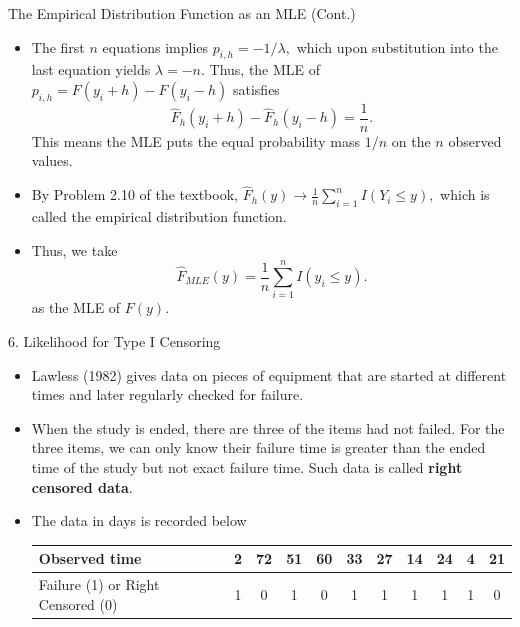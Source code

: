 \documentclass{beamer}
\begin{document}
        \begin{frame}{The Empirical Distribution Function as an MLE (Cont.)}
        \begin{itemize}
            \item The first $n$ equations implies $ p_{i,h} = -1/\lambda,$ which upon substitution into the last equation yields $\lambda = -n$. Thus, the MLE of $p_{i,h} = F(y_{i} + h) - F(y_{i} - h)$ satisfies
            $$\hat{F}_{h}(y_{i} + h) - \hat{F}_{h}(y_{i} - h) = \frac{1}{n}.$$
            This means the MLE puts the equal probability mass $1/n$ on the $n$ observed values.
            \item By Problem 2.10 of the textbook, 
            $\hat{F}_{h}(y) \rightarrow \frac{1}{n} \sum^{n}_{i=1}I(Y_{i} \leq y),$ which is called the empirical distribution function.
            \item Thus, we take 
            $$\hat{F}_{MLE}(y) = \frac{1}{n} \sum^{n}_{i=1}I(y_{i} \leq y).$$
            as the MLE of $F(y)$.
        \end{itemize}
    \end{frame}

    \begin{frame}{6. Likelihood for Type I Censoring}
        \begin{itemize}
            \item Lawless (1982) gives data on pieces of equipment that are started at different times and later regularly checked for failure. 
            \item When the study is ended, there are three of the items had not failed. For the three items, we can only know their failure time is greater than the ended time of the study but not exact failure time. Such data is called \textbf{right censored data}. 
            \item The data in days is recorded below
      
            \begin{small}
            \begin{table}
            \begin{tabular}{|p{3 cm}|c|c|c|c|c|c|c|c|c|c|}
                \hline
                Observed time & 2 & 72 & 51 & 60 & 33 & 27 & 14 & 24 & 4 & 21 \nonumber\\
                \hline
                Failure (1) or Right Censored (0) & 1 & 0 & 1 & 0 & 1 & 1 & 1 & 1 & 1 & 0 \nonumber\\
                 \hline
            \end{tabular}
            \end{table}
            \end{small}
        \end{itemize}
    \end{frame}
\end{document}

